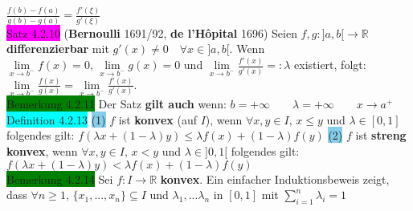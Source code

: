 \documentclass[landscape, 10pt]{article}
\newcommand{\R}{\mathbb{R}}
\begin{document}
\begin{multicols}{3}
                     \textcolor{NavyBlue}{
                     $\frac{f(b)-f(a)}{g(b)-g(a)}=\frac{f'(\xi)}{g'(\xi)}$}\\ 
              \colorbox{magenta}{Satz 4.2.10} 
              (\textbf{Bernoulli} 1691/92, \textbf{de l'Hôpital} 1696) 
                     Seien \textcolor{NavyBlue}{$f,g:]a,b[\longrightarrow\R$} 
                     \textbf{differenzierbar} mit 
                     \textcolor{NavyBlue}{$g'(x)\neq0\quad\forall x\in]a,b[$}. 
                     Wenn \textcolor{NavyBlue}{
                     $\lim\limits_{x\to b^{-}}f(x)=0,\,\lim\limits_{x\to b^{-}}g(x)=0$}
                     und \textcolor{NavyBlue}{
                     $\lim\limits_{x\to b^{-}}\frac{f'(x)}{g'(x)}=:\lambda$}
                     existiert, folgt: \textcolor{NavyBlue}{
                     $\lim\limits_{x\to b^{-}}\frac{f(x)}{g(x)}
                     =\lim\limits_{x\to b^{-}}\frac{f'(x)}{g'(x)}$}.\\
              \colorbox{green}{Bemerkung 4.2.11} 
                     Der Satz \textbf{gilt auch} wenn: 
                     \textcolor{NavyBlue}{
                     $b=+\infty\qquad\lambda=+\infty\qquad x\to a^{+}$}
              \colorbox{cyan}{Definition 4.2.13} 
                     \colorbox{SkyBlue}{(1)} \textcolor{NavyBlue}{$f$}
                     ist \textbf{konvex} (auf \textcolor{NavyBlue}{$I$}), wenn 
                     \textcolor{NavyBlue}{$\forall x,y\in I,\,x\leqslant y$ und $\lambda\in[0,1]$}
                     folgendes gilt: \textcolor{NavyBlue}{
                     $f(\lambda x+(1-\lambda)y)\leqslant\lambda f(x)+(1-\lambda)f(y)$}
                     \colorbox{SkyBlue}{(2)} \textcolor{NavyBlue}{$f$} ist 
                     \textbf{streng konvex}, 
                     wenn \textcolor{NavyBlue}{$\forall x,y\in I,\,x<y$}
                     und \textcolor{NavyBlue}{$\lambda\in]0,1[$} folgendes gilt: 
                     \textcolor{NavyBlue}{
                     $f(\lambda x+(1-\lambda)y)<\lambda f(x)+(1-\lambda)f(y)$}\\ 
              \colorbox{green}{Bemerkung 4.2.14} 
                     Sei \textcolor{NavyBlue}{$f:I\longrightarrow\R$} 
                     \textbf{konvex}. Ein einfacher Induktionsbeweis zeigt, dass 
                     \textcolor{NavyBlue}{
                     $\forall n\geqslant1,\,\{x_1,...,x_n\}\subseteq I$} 
                     und \textcolor{NavyBlue}{$\lambda_1,...\lambda_n$} in 
                     \textcolor{NavyBlue}{$[0,1]$} mit 
                     \textcolor{NavyBlue}{$\sum_{i=1}^n\lambda_i=1$}

\end{multicols}
\end{document}
